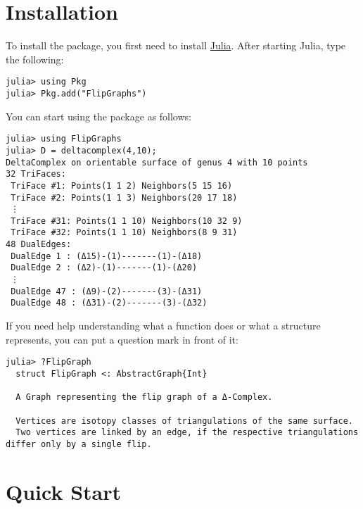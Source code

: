 \chapter{Installation}



\label{16848947351613073531}{}




To install the package, you first need to install \href{https://julialang.org}{Julia}.  After starting Julia, type the following:




\begin{verbatim}
julia> using Pkg 
julia> Pkg.add("FlipGraphs")
\end{verbatim}



You can start using the package as follows:




\begin{verbatim}
julia> using FlipGraphs
julia> D = deltacomplex(4,10);
DeltaComplex on orientable surface of genus 4 with 10 points
32 TriFaces:
 TriFace #1: Points(1 1 2) Neighbors(5 15 16)
 TriFace #2: Points(1 1 3) Neighbors(20 17 18)
 ⋮
 TriFace #31: Points(1 1 10) Neighbors(10 32 9)
 TriFace #32: Points(1 1 10) Neighbors(8 9 31)
48 DualEdges:
 DualEdge 1 : (Δ15)-(1)-------(1)-(Δ18)
 DualEdge 2 : (Δ2)-(1)-------(1)-(Δ20)
 ⋮
 DualEdge 47 : (Δ9)-(2)-------(3)-(Δ31)
 DualEdge 48 : (Δ31)-(2)-------(3)-(Δ32)
\end{verbatim}



If you need help understanding what a function does or what a structure represents, you can put a question mark in front of it:




\begin{verbatim}
julia> ?FlipGraph
  struct FlipGraph <: AbstractGraph{Int}

  A Graph representing the flip graph of a Δ-Complex.

  Vertices are isotopy classes of triangulations of the same surface.
  Two vertices are linked by an edge, if the respective triangulations differ only by a single flip.
\end{verbatim}



\chapter{Quick Start}



